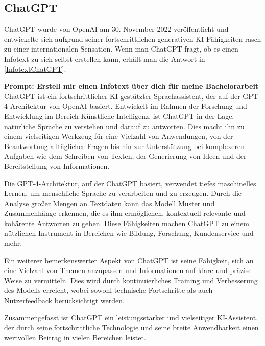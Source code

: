 \subsection{ChatGPT}  \label{ChatGPT}


ChatGPT wurde von OpenAI am 30. November 2022 veröffentlicht und entwickelte sich aufgrund seiner fortschrittlichen 
generativen KI-Fähigkeiten rasch zu einer internationalen Sensation. Wenn man ChatGPT fragt, ob es einen Infotext 
zu sich selbst erstellen kann, erhält man die Antwort in \autoref{InfotextChatGPT}.

\begin{prompt} 
    \begin{tcolorbox}[colback=gray!20, colframe=gray!20, boxrule=0pt, sharp corners] 
    \textbf{Prompt: Erstell mir einen Infotext über dich für meine Bachelorarbeit}\\ 

    ChatGPT ist ein fortschrittlicher KI-gestützter Sprachassistent, der auf der GPT-4-Architektur von OpenAI basiert. 
    Entwickelt im Rahmen der Forschung und Entwicklung im Bereich Künstliche Intelligenz, ist ChatGPT in der Lage, 
    natürliche Sprache zu verstehen und darauf zu antworten. Dies macht ihn zu einem vielseitigen Werkzeug für eine 
    Vielzahl von Anwendungen, von der Beantwortung alltäglicher Fragen bis hin zur Unterstützung bei komplexeren 
    Aufgaben wie dem Schreiben von Texten, der Generierung von Ideen und der Bereitstellung von Informationen.
    
    Die GPT-4-Architektur, auf der ChatGPT basiert, verwendet tiefes maschinelles Lernen, um menschliche Sprache zu 
    verarbeiten und zu erzeugen. Durch die Analyse großer Mengen an Textdaten kann das Modell Muster und Zusammenhänge 
    erkennen, die es ihm ermöglichen, kontextuell relevante und kohärente Antworten zu geben. Diese Fähigkeiten machen 
    ChatGPT zu einem nützlichen Instrument in Bereichen wie Bildung, Forschung, Kundenservice und mehr.
    
    Ein weiterer bemerkenswerter Aspekt von ChatGPT ist seine Fähigkeit, sich an eine Vielzahl von Themen anzupassen 
    und Informationen auf klare und präzise Weise zu vermitteln. Dies wird durch kontinuierliches Training und 
    Verbesserung des Modells erreicht, wobei sowohl technische Fortschritte als auch Nutzerfeedback berücksichtigt 
    werden.
    
    Zusammengefasst ist ChatGPT ein leistungsstarker und vielseitiger KI-Assistent, der durch seine fortschrittliche 
    Technologie und seine breite Anwendbarkeit einen wertvollen Beitrag in vielen Bereichen leistet.
    \vfill
    \end{tcolorbox}
    \caption{Infotext ChatGPT, Quelle: ChatGPT}
    \label{InfotextChatGPT}
\end{prompt}

